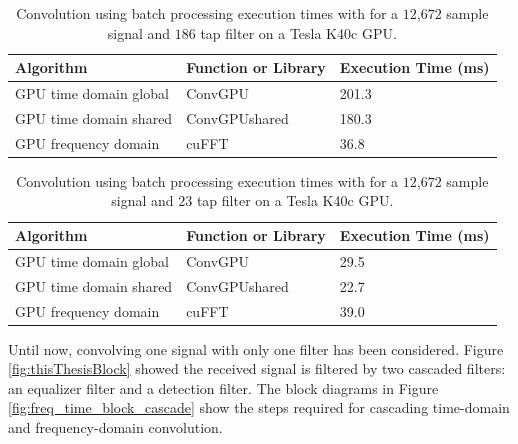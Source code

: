 \begin{table}
\captionsetup{width=6in}
\caption{Convolution using batch processing execution times with for a $12$,$672$ sample signal and $186$ tap filter on a Tesla K40c GPU.}
\begin{center}
\begin{tabular}{lll}
	\toprule
	Algorithm 				& Function or Library		& Execution Time (ms) \\ \midrule
	GPU time domain global 	& ConvGPU 					& 201.3		\\
	GPU time domain shared 	& ConvGPUshared 			& 180.3		\\
	GPU frequency domain 	& cuFFT						& 36.8 		\\ 
	\bottomrule
\end{tabular}
\end{center}
\label{tab:Batched_CPUvsGPUtable_12672_186}
\end{table}
\begin{table}
\captionsetup{width=6in}
\caption{Convolution using batch processing execution times with for a $12$,$672$ sample signal and $23$ tap filter on a Tesla K40c GPU.}
\begin{center}
\begin{tabular}{lll}
	\toprule
	Algorithm 				& Function or Library		& Execution Time (ms) \\ \midrule
	GPU time domain global 	& ConvGPU 					& 29.5		\\
	GPU time domain shared 	& ConvGPUshared 			& 22.7			\\
	GPU frequency domain 	& cuFFT						& 39.0		\\ 
	\bottomrule
\end{tabular}
\end{center}
\label{tab:Batched_CPUvsGPUtable_12672_23}
\end{table}

Until now, convolving one signal with only one filter has been considered.
Figure \ref{fig:thisThesisBlock} showed the received signal is filtered by two cascaded filters: 
an equalizer filter and a detection filter.
The block diagrams in Figure \ref{fig:freq_time_block_cascade} show the steps required for cascading time-domain and frequency-domain convolution.


